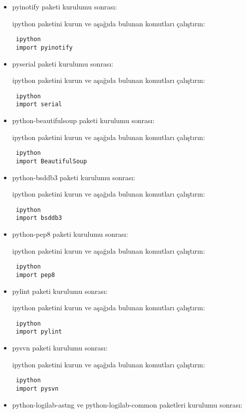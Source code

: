 \documentclass[a4paper,10pt]{article}
\begin{document}
\begin{itemize}
\item pyinotify paketi kurulumu sonrası:

ipython paketini kurun ve aşağıda bulunan komutları çalıştırın:
\begin{verbatim}
 ipython
 import pyinotify
\end{verbatim}

\item pyserial  paketi kurulumu sonrası:

ipython paketini kurun ve aşağıda bulunan komutları çalıştırın:
\begin{verbatim}
 ipython
 import serial
\end{verbatim}

\item python-beautifulsoup  paketi kurulumu sonrası:

ipython paketini kurun ve aşağıda bulunan komutları çalıştırın:
\begin{verbatim}
 ipython
 import BeautifulSoup
\end{verbatim}

\item python-bsddb3  paketi kurulumu sonrası:

ipython paketini kurun ve aşağıda bulunan komutları çalıştırın:
\begin{verbatim}
 ipython
 import bsddb3
\end{verbatim}

\item python-pep8  paketi kurulumu sonrası:

ipython paketini kurun ve aşağıda bulunan komutları çalıştırın:
\begin{verbatim}
 ipython
 import pep8
\end{verbatim}

\item pylint  paketi kurulumu sonrası:

ipython paketini kurun ve aşağıda bulunan komutları çalıştırın:
\begin{verbatim}
 ipython
 import pylint
\end{verbatim}

\item pysvn  paketi kurulumu sonrası:

ipython paketini kurun ve aşağıda bulunan komutları çalıştırın:
\begin{verbatim}
 ipython
 import pysvn
\end{verbatim}

\item python-logilab-astng ve python-logilab-common  paketleri kurulumu sonrası:


\end{itemize}
\end{document}
